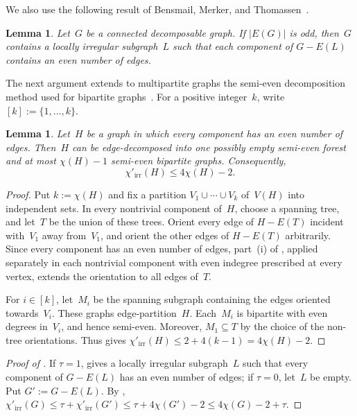 \documentclass[12pt,reqno,a4paper]{amsart}
\newtheorem{lemma}[theorem]{Lemma}
\newcommand{\lir}{\chi'_{\mathrm{irr}}}
\begin{document}
We also use the following result of Bensmail, Merker, and
Thomassen~\cite[Theorem~2.3]{BeMeTh17}.

\begin{lemma}\label{lem:odd-reduction}
  Let~$G$ be a connected decomposable graph.
  If $|E(G)|$ is odd, then~$G$ contains a locally irregular subgraph~$L$ such
  that each component of $G-E(L)$ contains an even number of edges.
\end{lemma}

The next argument extends to multipartite graphs the semi-even decomposition
method used for bipartite graphs~\cite{BeMeTh17,LuPrSo18}.
For a positive integer~$k$, write $[k]:=\{1,\ldots,k\}$.

\begin{lemma}\label{lem:partite-residual}
  Let~$H$ be a graph in which every component has an even number of edges.
  Then~$H$ can be edge-decomposed into one possibly empty semi-even forest and
  at most $\chi(H)-1$ semi-even bipartite graphs.
  Consequently,
  \[
    \lir(H)\le4\chi(H)-2.
  \]
\end{lemma}
\begin{proof}
  Put $k:=\chi(H)$ and fix a partition $V_1 \cup \cdots \cup V_k$ of~$V(H)$
  into independent sets. In every nontrivial component of~$H$, choose a
  spanning tree, and let~$T$ be the union of these trees.
  Orient every edge of $H-E(T)$ incident with~$V_1$ away from~$V_1$, and orient
  the other edges of $H-E(T)$ arbitrarily.
  Since every component has an even number of edges, part~(i) of
  , applied separately in each nontrivial
  component with even indegree prescribed at every vertex, extends the
  orientation to all edges of~$T$.

  For $i \in [k]$, let~$M_i$ be the spanning subgraph containing the edges
  oriented towards~$V_i$. These graphs edge-partition~$H$. Each~$M_i$ is
  bipartite with even degrees in~$V_i$, and hence semi-even.
  Moreover, $M_1\subseteq T$ by the choice of the non-tree orientations.
  Thus  gives
  $\lir(H)\le2+4(k-1)=4\chi(H)-2$.
\end{proof}

\begin{proof}[Proof of ]
  If $\tau=1$,  gives a locally irregular subgraph~$L$
  such that every component of $G-E(L)$ has an even number of edges; if
  $\tau=0$, let~$L$ be empty. Put $G':=G-E(L)$. By
  ,
  $\lir(G)\le\tau+\lir(G') \le\tau+4\chi(G')-2 \le4\chi(G)-2+\tau$.
\end{proof}
\end{document}
